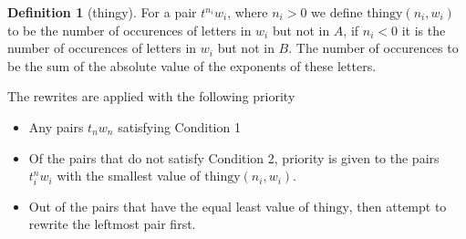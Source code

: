 \documentclass[11pt]{article} %
\theoremstyle{definition}
\theoremstyle{definition}
\theoremstyle{definition}
\theoremstyle{definition}
\theoremstyle{definition}
\newtheorem{defn}[theorem]{Definition}
\theoremstyle{definition}
\begin{document}
\begin{defn}[thingy]
For a pair $t^{n_i}w_i$, where $n_i > 0$ we define $\text{thingy}(n_i, w_i)$ to be the number of
occurences of letters in $w_i$ but not in $A$, if $n_i < 0$ it is the number of occurences
of letters in $w_i$ but not in $B$. The number of occurences to be the sum of the absolute
value of the exponents of these letters.
\end{defn}

The rewrites are applied with the following priority

\begin{itemize}
  \item Any pairs $t_nw_n$ satisfying Condition 1
  \item Of the pairs that do not satisfy Condition 2, priority is given
    to the pairs $t^n_iw_i$ with the smallest value of $\text{thingy}(n_i, w_i)$.
  \item Out of the pairs that have the equal least value of $\text{thingy}$,
    then attempt to rewrite the leftmost pair first.
\end{itemize}






\end{document}

